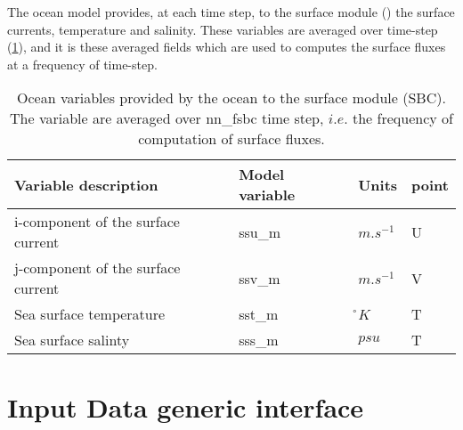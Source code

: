 \documentclass[NEMO_book]{subfiles}
\begin{document}
The ocean model provides, at each time step, to the surface module () 
the surface currents, temperature and salinity.  
These variables are averaged over  time-step (\ref{Tab_ssm}), 
and it is these averaged fields which are used to computes the surface fluxes 
at a frequency of  time-step.


\begin{table}[tb]   \begin{center}   \begin{tabular}{|l|l|l|l|}
\hline
Variable description					& Model variable	& Units	& point \\	\hline
i-component of the surface current	& ssu\_m	& $m.s^{-1}$	& U \\	\hline
j-component of the surface current	& ssv\_m	& $m.s^{-1}$	& V \\	\hline
Sea surface temperature				& sst\_m	& \r{}$K$		& T \\	\hline
Sea surface salinty					& sss\_m	& $psu$			& T \\	\hline
\end{tabular}
\caption{  \label{Tab_ssm}   
Ocean variables provided by the ocean to the surface module (SBC). 
The variable are averaged over nn{\_}fsbc time step, $i.e.$ the frequency of 
computation of surface fluxes.}
\end{center}   \end{table}



\section{Input Data generic interface}
\label{SBC_input}
\end{document}
